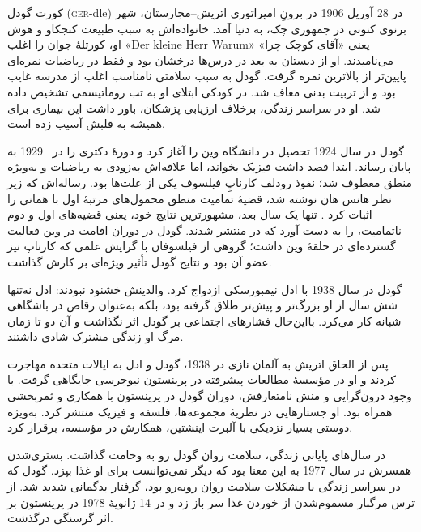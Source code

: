 \documentclass[../../../include/open-logic-section]{subfiles}
\begin{document}



کورت گودل (\textsc{ger}-dle) در 28 آوریل 1906 در برونِ امپراتوری
اتریش--مجارستان، شهر برنوی کنونی در جمهوری چک، به دنیا آمد. خانواده‌اش
به سبب طبیعت کنجکاو و هوش او، کورتلهٔ جوان را اغلب «Der kleine Herr
Warum» یعنی «آقای کوچک چرا» می‌نامیدند. او از دبستان به بعد در درس‌ها
درخشان بود و فقط در ریاضیات نمره‌ای پایین‌تر از بالاترین نمره گرفت.
گودل به سبب سلامتی نامناسب اغلب از مدرسه غایب بود و از تربیت بدنی معاف
شد. در کودکی ابتلای او به تب روماتیسمی تشخیص داده شد. او در سراسر
زندگی، برخلاف ارزیابی پزشکان، باور داشت این بیماری برای همیشه به قلبش
آسیب زده است.

گودل در سال 1924 تحصیل در دانشگاه وین را آغاز کرد و دورهٔ دکتری را در
~1929 به پایان رساند. ابتدا قصد داشت فیزیک بخواند، اما علاقه‌اش به‌زودی
به ریاضیات و به‌ویژه منطق معطوف شد؛ نفوذ رودلف کارناپِ فیلسوف یکی از
علت‌ها بود. رساله‌اش که زیر نظر هانس هان نوشته شد، قضیهٔ تمامیت منطق
محمول‌های مرتبهٔ اول با همانی را اثبات کرد \citep{Godel1929}. تنها یک
سال بعد، مشهورترین نتایج خود، یعنی قضیه‌های اول و دوم ناتمامیت، را به
دست آورد که در \citealt{Godel1931} منتشر شدند. گودل در دوران اقامت در
وین فعالیت گسترده‌ای در حلقهٔ وین داشت؛ گروهی از فیلسوفان با گرایش
علمی که کارناپ نیز عضو آن بود و نتایج گودل تأثیر ویژه‌ای بر کارش گذاشت.

گودل در سال 1938 با ادل نیمبورسکی ازدواج کرد. والدینش خشنود نبودند:
ادل نه‌تنها شش سال از او بزرگ‌تر و پیش‌تر طلاق گرفته بود، بلکه به‌عنوان
رقاص در باشگاهی شبانه کار می‌کرد. بااین‌حال فشارهای اجتماعی بر گودل
اثر نگذاشت و آن دو تا زمان مرگ او زندگی مشترک شادی داشتند.

پس از الحاق اتریش به آلمان نازی در 1938، گودل و ادل به ایالات متحده
مهاجرت کردند و او در مؤسسهٔ مطالعات پیشرفته در پرینستون نیوجرسی
جایگاهی گرفت. با وجود درون‌گرایی و منش نامتعارفش، دوران گودل در
پرینستون با همکاری و ثمربخشی همراه بود. او جستارهایی در نظریهٔ
مجموعه‌ها، فلسفه و فیزیک منتشر کرد. به‌ویژه دوستی بسیار نزدیکی با
آلبرت اینشتین، همکارش در مؤسسه، برقرار کرد.

در سال‌های پایانی زندگی، سلامت روان گودل رو به وخامت گذاشت. بستری‌شدن
همسرش در سال 1977 به این معنا بود که دیگر نمی‌توانست برای او غذا
بپزد. گودل که در سراسر زندگی با مشکلات سلامت روان روبه‌رو بود، گرفتار
بدگمانی شدید شد. از ترس مرگبار مسموم‌شدن از خوردن غذا سر باز زد و در
14 ژانویهٔ 1978 در پرینستون بر اثر گرسنگی درگذشت.
\end{document}
